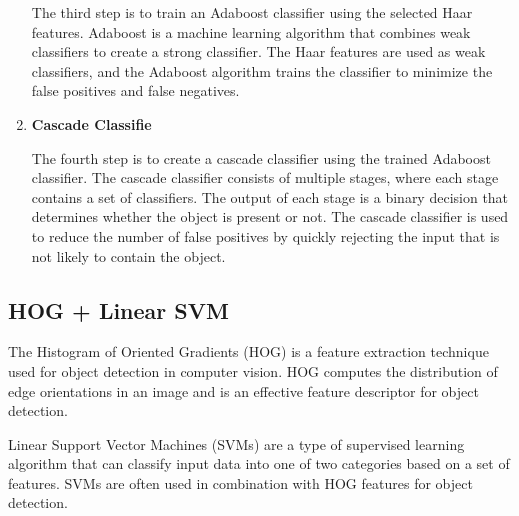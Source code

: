 \begin{enumerate}
          The third step is to train an Adaboost classifier using the selected Haar
          features. Adaboost is a machine learning algorithm that combines weak
          classifiers to create a strong classifier. The Haar features are used as weak
          classifiers, and the Adaboost algorithm trains the classifier to minimize the
          false positives and false negatives.

    \item \textbf{Cascade Classifie}

          The fourth step is to create a cascade classifier using the trained Adaboost
          classifier. The cascade classifier consists of multiple stages, where each
          stage contains a set of classifiers. The output of each stage is a binary
          decision that determines whether the object is present or not. The cascade
          classifier is used to reduce the number of false positives by quickly rejecting
          the input that is not likely to contain the object.

\end{enumerate}

\subsection{HOG + Linear SVM}
The Histogram of Oriented Gradients (HOG) is a feature extraction technique
used for object detection in computer vision. HOG computes the distribution of
edge orientations in an image and is an effective feature descriptor for object
detection.

Linear Support Vector Machines (SVMs) are a type of supervised learning
algorithm that can classify input data into one of two categories based on a
set of features. SVMs are often used in combination with HOG features for
object detection. \cite{hgms:hog-multiscale}


